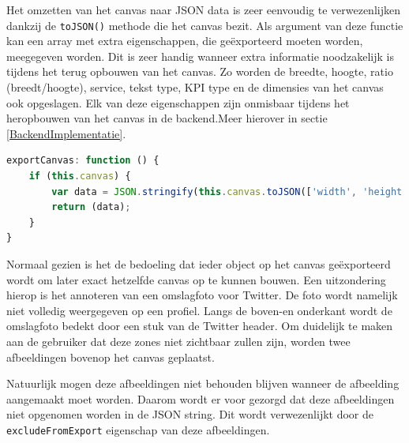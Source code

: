 Het omzetten van het canvas naar JSON data is zeer eenvoudig te verwezenlijken dankzij de \texttt{toJSON()} methode die het canvas bezit. Als argument van deze functie kan een array met extra eigenschappen, die ge\"{e}xporteerd moeten worden, meegegeven worden. Dit is zeer handig wanneer extra informatie noodzakelijk is tijdens het terug opbouwen van het canvas. Zo worden de breedte, hoogte, ratio (breedt/hoogte), service, tekst type, KPI type en de dimensies van het canvas ook opgeslagen. Elk van deze eigenschappen zijn onmisbaar tijdens het heropbouwen van het canvas in de backend.Meer hierover in sectie \ref{BackendImplementatie}. 

\begin{lstlisting}[caption={ThemeAnnotations component - exporteren van het canvas},label=lst:ThemeDispatcherEventsThemeAnnotations,language=javascript]
exportCanvas: function () {
	if (this.canvas) {
		var data = JSON.stringify(this.canvas.toJSON(['width', 'height', 'multiply', 'service', 'textType', 'kpiType', 'dimensions']));
		return (data);
	}
}
\end{lstlisting}

Normaal gezien is het de bedoeling dat ieder object op het canvas ge\"{e}xporteerd wordt om later exact hetzelfde canvas op te kunnen bouwen. Een uitzondering hierop is het annoteren van een omslagfoto voor Twitter. De foto wordt namelijk niet volledig weergegeven op een profiel. Langs de boven-en onderkant wordt de omslagfoto bedekt door een stuk van de Twitter header. Om duidelijk te maken aan de gebruiker dat deze zones niet zichtbaar zullen zijn, worden twee afbeeldingen bovenop het canvas geplaatst. 


Natuurlijk mogen deze afbeeldingen niet behouden blijven wanneer de afbeelding aangemaakt moet worden. Daarom wordt er voor gezorgd dat deze afbeeldingen niet opgenomen worden in de JSON string. Dit wordt verwezenlijkt door de \texttt{excludeFromExport} eigenschap van deze afbeeldingen.



